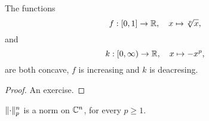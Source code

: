 \begin{lemma}\label{lemma:two-concave-functions}
  The functions
  \begin{equation}\label{eq:f-function}
    f:[0,1]\to\mathbb{R},\quad{x\mapsto{\sqrt[p]{x}}},
  \end{equation}
  and
  \begin{equation}\label{eq:k-function}
    k:[0,\infty)\to\mathbb{R},\quad{x\mapsto{-x^{p}}},
  \end{equation}
  are both concave, \(f\) is increasing and \(k\) is deacresing.
\end{lemma}

\begin{proof}
  An exercise.
\end{proof}

\begin{proposition}\label{proposition:the-p-norm-is-in-fact-a-norm}
  \(\norm<n>(p)\) is a norm on \(\mathbb{C}^{n}\), for every
  \(p\geqslant{1}\).
\end{proposition}

